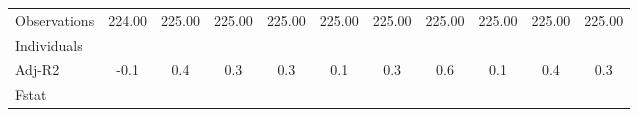 {\begin{tabular}{l*{10}{c}}
Observations        &224.00   &225.00   &225.00   &225.00   &225.00   &225.00   &225.00   &225.00   &225.00   &225.00   \\
Individuals         &         &         &         &         &         &         &         &         &         &         \\
Adj-R2              &  -0.1   &   0.4   &   0.3   &   0.3   &   0.1   &   0.3   &   0.6   &   0.1   &   0.4   &   0.3   \\
Fstat               &         &         &         &         &         &         &         &         &         &         \\
\hline\hline
\end{tabular}
}
